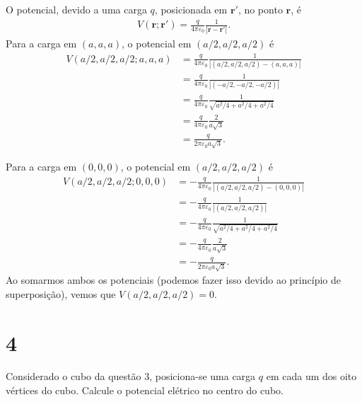\documentclass[11pt]{article}
\begin{document}
O potencial, devido a uma carga \(q\), posicionada em \(\mathbf r'\), no
ponto \(\mathbf r\), é
\begin{align}
  V(\mathbf r; \mathbf r') = \frac{q}{4\pi\varepsilon_0}\frac{1}{|\mathbf r - \mathbf r'|}.\label{eq:1}
\end{align}
Para a carga em \((a,a,a)\), o potencial em \((a/2,a/2,a/2)\) é
\begin{align}
  V(a/2,a/2,a/2;a,a,a) &= \frac{q}{4\pi\varepsilon_0}\frac{1}{|(a/2,a/2,a/2) - (a,a,a)|}\\
                       &= \frac{q}{4\pi\varepsilon_0}\frac{1}{|(-a/2,-a/2,-a/2)|}\\
                       &= \frac{q}{4\pi\varepsilon_0}\frac{1}{\sqrt{a^2/4+a^2/4+a^2/4}}\\
                       &= \frac{q}{4\pi\varepsilon_0}\frac{2}{a\sqrt{3}}\\
                       &= \frac{q}{2\pi\varepsilon_0a\sqrt{3}}.
\end{align}

Para a carga em \((0,0,0)\), o potencial em \((a/2,a/2,a/2)\) é
\begin{align*}
  V(a/2,a/2,a/2;0,0,0) &= -\frac{q}{4\pi\varepsilon_0}\frac{1}{|(a/2,a/2,a/2) - (0,0,0)|}\\
                       &= -\frac{q}{4\pi\varepsilon_0}\frac{1}{|(a/2,a/2,a/2)|}\\
                       &= -\frac{q}{4\pi\varepsilon_0}\frac{1}{\sqrt{a^2/4+a^2/4+a^2/4}}\\
                       &= -\frac{q}{4\pi\varepsilon_0}\frac{2}{a\sqrt{3}}\\
                       &= -\frac{q}{2\pi\varepsilon_0a\sqrt{3}}.
\end{align*}
Ao somarmos ambos os potenciais (podemos fazer isso devido ao princípio
de superposição), vemos que \(V(a/2,a/2,a/2) = 0\).
\section{4}
\label{sec:orgbb32bdc}
Considerado o cubo da questão 3, posiciona-se uma carga \(q\) em cada um
dos oito vértices do cubo. Calcule o potencial elétrico no centro do
cubo.
\end{document}
